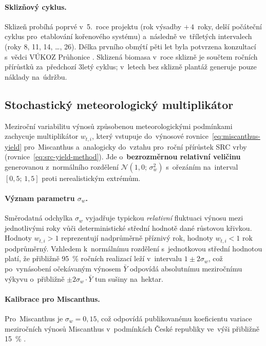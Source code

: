 \paragraph{Sklizňový cyklus.}
Sklizeň probíhá poprvé v~5.~roce projektu (rok výsadby $+\,4$~roky,
delší počáteční cyklus pro~etablování kořenového systému) a~následně
ve~tříletých intervalech (roky 8, 11, 14, \ldots, 26). Délka prvního
obmýtí pěti let byla potvrzena konzultací s~vědci VÚKOZ Průhonice
\citep{VUKOZ2026}. Sklizená biomasa v~roce sklizně je součtem ročních
přírůstků za~předchozí 3letý cyklus; v~letech bez sklizně plantáž
generuje pouze náklady na~údržbu.
\subsection{Stochastický meteorologický multiplikátor}
\label{sec:weather_mult}

Meziroční variabilitu výnosů způsobenou meteorologickými podmínkami zachycuje
multiplikátor $w_{t,i}$, který vstupuje do~výnosové
rovnice~\eqref{eq:miscanthus-yield} pro~Miscanthus a~analogicky do~vztahu
pro~roční přírůstek SRC vrby (rovnice~\eqref{eq:src-yield-method}).
Jde o~\textbf{bezrozměrnou relativní veličinu} generovanou z~normálního
rozdělení $\mathcal{N}(1{,}0;\, \sigma_w^2)$ s~ořezáním na~interval
$[0{,}5;\, 1{,}5]$ proti nerealistickým extrémům.

\paragraph{Význam parametru $\sigma_w$.}
Směrodatná odchylka $\sigma_w$ vyjadřuje typickou \textit{relativní}
fluktuaci výnosu mezi jednotlivými roky vůči deterministické střední
hodnotě dané růstovou křivkou. Hodnoty $w_{t,i} > 1$ reprezentují
nadprůměrně příznivý rok, hodnoty $w_{t,i} < 1$ rok podprůměrný.
Vzhledem k~normálnímu rozdělení s~jednotkovou střední hodnotou platí,
že přibližně 95~\% ročních realizací leží v~intervalu
$1 \pm 2\sigma_w$, což po~vynásobení očekávaným výnosem
$\bar{Y}$ odpovídá absolutnímu meziročnímu výkyvu o~přibližně
$\pm 2\sigma_w \cdot \bar{Y}$ tun sušiny na~hektar.

\paragraph{Kalibrace pro Miscanthus.}
Pro~Miscanthus je $\sigma_w = 0{,}15$, což odpovídá publikovanému
koeficientu variace meziročních výnosů Miscanthus v~podmínkách
České republiky ve~výši přibližně 15~\% \citep{knapek_2024}.

